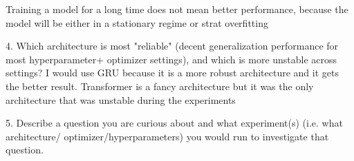 \begin{enumerate}
Training a model for a long time does not mean better performance, because the model will be either in a stationary regime or strat overfitting

4. Which architecture is most "reliable" (decent generalization performance for most hyperparameter+
optimizer settings), and which is more unstable across settings?
I would use GRU because it is a more robust architecture and it gets the better result. Transformer is a fancy architecture but it was the only architecture that was unstable during the experiments

5. Describe a question you are curious about and what experiment(s) (i.e. what architecture/
optimizer/hyperparameters) you would run to investigate that question.



\end{enumerate}